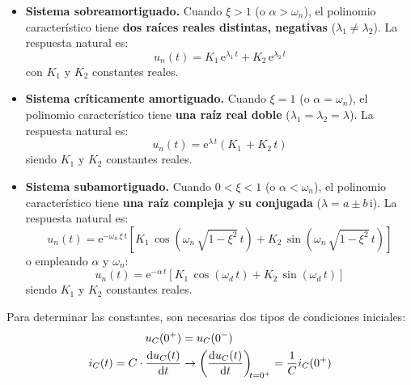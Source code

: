 \begin{itemize}
\item \textbf{Sistema sobreamortiguado.} Cuando $\xi>1$ (o
  $\alpha>\omega_n$), el polinomio característico tiene \textbf{dos
    raíces reales distintas, negativas} ($\lambda_1\neq\lambda_2$). La
  respuesta natural es:
  \begin{equation*}
    u_n(t)=K_1\,\mathrm{e}^{\lambda_1\,t}+K_2\,\mathrm{e}^{\lambda_2\,t}   
  \end{equation*}
  con $K_1$ y $K_2$ constantes reales.
\item \textbf{Sistema críticamente amortiguado.} Cuando $\xi=1$ (o
  $\alpha=\omega_n$), el polinomio característico tiene \textbf{una
    raíz real doble} ($\lambda_1=\lambda_2=\lambda$). La respuesta
  natural es:
  \begin{equation*}
    u_n(t)=\mathrm{e}^{\lambda\,t}(K_1\,+K_2\,t)   
  \end{equation*}
  siendo $K_1$ y $K_2$ constantes reales.
\item \textbf{Sistema subamortiguado.} Cuando $0<\xi<1$ (o
  $\alpha<\omega_n$), el polinomio característico tiene \textbf{una
    raíz compleja y su conjugada} ($\lambda=a\pm b\,\mathrm{i}$). La
  respuesta natural es:
  \begin{equation*}
    u_n(t)=\mathrm{e}^{-\omega_n\,\xi \,t}\left[K_1\,\cos(\omega_n\,\sqrt{1-\xi^2}\,t)+K_2\,\sin(\omega_n\,\sqrt{1-\xi^2}\,t) \right]
  \end{equation*}
  o empleando $\alpha$ y $\omega_n$:
  \begin{equation*}
    u_n(t)=\mathrm{e}^{-\alpha \,t}\left[K_1\,\cos(\omega_d \,t)+K_2\,\sin(\omega_d\,t) \right]
  \end{equation*}
  siendo $K_1$ y $K_2$ constantes reales.
\end{itemize}
	
Para determinar las constantes, son necesarias dos tipos de
condiciones iniciales:
\begin{align*}
  u_C(0^+) &= u_C(0^-)\\
  i_C(t) = C \cdot \diff{u_C(t)}{t}& \rightarrow   \diff{u_C(t)}{t}[t = 0^+] = \frac{1}{C} i_C(0^+)
\end{align*}

